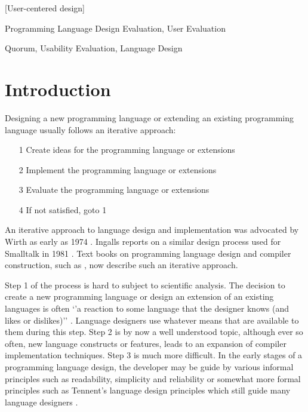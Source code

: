 \documentclass[preprint,10pt]{sigplanconf}
\begin{document}
[User-centered design]

\terms
Programming Language Design Evaluation, User Evaluation

\keywords
Quorum, Usability Evaluation, Language Design

\section{Introduction}
Designing a new programming language or extending an existing programming language usually follows an iterative approach:
\begin{itemize}
\item[1] Create ideas for the programming language or extensions
\item[2] Implement  the programming language or extensions
\item[3] Evaluate  the programming language or extensions
\item[4] If not satisfied, goto 1
\end{itemize}

An iterative approach to language design and implementation was advocated by Wirth as early as 1974 \cite{wirth1974design}.
Ingalls reports on a similar design process used for Smalltalk in 1981 \cite{ingalls1981design}. Text books on programming language design and compiler construction, such as \cite{watt2000programming}, now describe such an iterative approach.

Step 1 of the process is hard to subject to scientific analysis. The decision to create a new programming language or design an extension of an existing languages is often `'a reaction to some language that the designer knows (and likes or dislikes)'' \cite{sestoft2012programming}. Language designers use whatever means that are available to them during this step. Step 2 is by now a well understood topic, although ever so often, new language constructs or features, leads to an expansion of compiler implementation techniques. Step 3 is much more difficult. In the early stages of a programming language design, the developer may be guide by various informal principles such as readability, simplicity and reliability \cite{pratt1984programming,sebesta2012concepts} or somewhat more formal principles such as Tennent's language design principles \cite{tennent1981principles} which still guide many language designers \cite{sestoft2012programming}.
\end{document}
